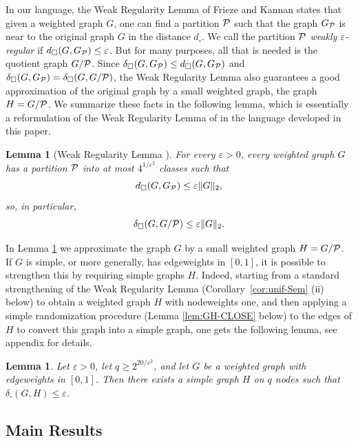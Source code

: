 \documentclass[12pt]{article}
\newtheorem{lemma}[theorem]{Lemma}
\numberwithin{equation}{section}
\def\eps{\varepsilon}
\def\PP{{\cal P}}\def\QQ{{\cal Q}}\def\RR{{\cal R}}
\begin{document}
In our language, the Weak Regularity Lemma of Frieze and Kannan
states that given a weighted graph $G$, one can find a partition
$\PP$ such that the graph $G_\PP$ is near to the original graph $G$
in the distance $d_\square$. We call the partition $\PP$ {\it weakly
$\eps$-regular} if $d_\square(G,G_\PP)\le\eps$. But for many
purposes, all that is needed is the quotient graph $G/\PP$. Since
$\delta_\square(G,G_\PP)\leq d_\square(G,G_\PP)$ and
$\delta_\square(G,G_\PP)=\delta_\square(G,G/\PP)$, the Weak
Regularity Lemma also guarantees a good approximation of the original
graph by a small weighted graph, the graph $H=G/\PP$. We summarize
these facts in the following lemma, which is essentially a
reformulation of the Weak Regularity Lemma of \cite{FK} in the
language developed in this paper.

\begin{lemma}[Weak Regularity Lemma \cite{FK}]\label{lem:szem-weak}
For every $\eps>0$, every weighted graph $G$ has a partition $\PP$ into at
most $4^{1/\eps^2}$ classes such that
\begin{equation}\label{szem-weak-d}
d_\square(G,G_\PP)\leq \eps\|G\|_2,
\end{equation}
so, in particular,
\begin{equation}
\label{szem-weak-delta} \delta_\square(G,G/\PP)\leq\eps\|G\|_2.
\end{equation}
\end{lemma}

In Lemma \ref{lem:szem-weak} we approximate the graph $G$ by a small
weighted graph $H=G/\PP$. If $G$ is simple, or more generally, has
edgeweights in $[0,1]$, it is possible to strengthen this by
requiring simple graphs $H$. Indeed, starting from a standard
strengthening of the Weak Regularity Lemma
(Corollary~\ref{cor:unif-Sem} (ii) below) to obtain a weighted graph
$H$ with nodeweights one, and then applying a simple randomization
procedure (Lemma \ref{lem:GH-CLOSE} below) to the edges of $H$ to
convert this graph into a simple graph, one gets the following lemma,
see appendix for details.

\begin{lemma}\label{lem:short-Szemeredi-simple}
Let $\eps>0$, let $q\geq 2^{20/\eps^2}$, and let $G$ be a weighted
graph with edgeweights in $[0,1]$. Then there exists a simple graph
$H$ on $q$ nodes such that $\delta_\square(G,H)\leq\eps$.
\end{lemma}

\subsection{Main Results}
\end{document}
